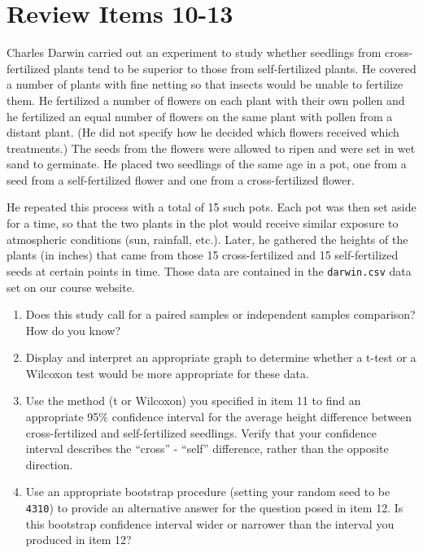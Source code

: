 \documentclass[
]{book}
\providecommand{\tightlist}{%
  \setlength{\itemsep}{0pt}\setlength{\parskip}{0pt}}
\begin{document}
\hypertarget{review-items-10-13}{%
\section{Review Items 10-13}\label{review-items-10-13}}

Charles Darwin carried out an experiment to study whether seedlings from cross-fertilized plants tend to be superior to those from self-fertilized plants. He covered a number of plants with fine netting so that insects would be unable to fertilize them. He fertilized a number of flowers on each plant with their own pollen and he fertilized an equal number of flowers on the same plant with pollen from a distant plant. (He did not specify how he decided which flowers received which treatments.) The seeds from the flowers were allowed to ripen and were set in wet sand to germinate. He placed two seedlings of the same age in a pot, one from a seed from a self-fertilized flower and one from a cross-fertilized flower.

He repeated this process with a total of 15 such pots. Each pot was then set aside for a time, so that the two plants in the plot would receive similar exposure to atmospheric conditions (sun, rainfall, etc.). Later, he gathered the heights of the plants (in inches) that came from those 15 cross-fertilized and 15 self-fertilized seeds at certain points in time. Those data are contained in the \texttt{darwin.csv} data set on our course website.

\begin{enumerate}
\def\labelenumi{\arabic{enumi}.}
\setcounter{enumi}{9}
\tightlist
\item
  Does this study call for a paired samples or independent samples comparison? How do you know?
\item
  Display and interpret an appropriate graph to determine whether a t-test or a Wilcoxon test would be more appropriate for these data.
\item
  Use the method (t or Wilcoxon) you specified in item 11 to find an appropriate 95\% confidence interval for the average height difference between cross-fertilized and self-fertilized seedlings. Verify that your confidence interval describes the ``cross'' - ``self'' difference, rather than the opposite direction.
\item
  Use an appropriate bootstrap procedure (setting your random seed to be \texttt{4310}) to provide an alternative answer for the question posed in item 12. Is this bootstrap confidence interval wider or narrower than the interval you produced in item 12?
\end{enumerate}
\end{document}

